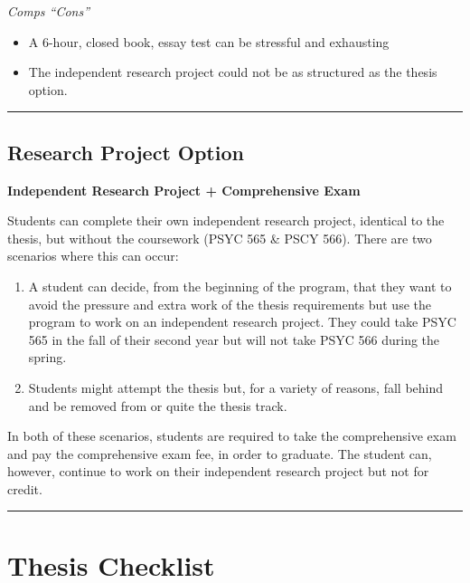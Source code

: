 \documentclass[openany]{book}
\providecommand{\tightlist}{%
  \setlength{\itemsep}{0pt}\setlength{\parskip}{0pt}}
\begin{document}
\emph{Comps ``Cons''}

\begin{itemize}
\tightlist
\item
  A 6-hour, closed book, essay test can be stressful and exhausting
\item
  The independent research project could not be as structured as the thesis option.
\end{itemize}

\begin{center}\rule{0.5\linewidth}{0.5pt}\end{center}

\hypertarget{research-project-option}{%
\section{Research Project Option}\label{research-project-option}}

\textbf{Independent Research Project + Comprehensive Exam}

Students can complete their own independent research project, identical to the thesis, but without the coursework (PSYC 565 \& PSCY 566). There are two scenarios where this can occur:

\begin{enumerate}
\def\labelenumi{\arabic{enumi}.}
\tightlist
\item
  A student can decide, from the beginning of the program, that they want to avoid the pressure and extra work of the thesis requirements but use the program to work on an independent research project. They could take PSYC 565 in the fall of their second year but will not take PSYC 566 during the spring.
\item
  Students might attempt the thesis but, for a variety of reasons, fall behind and be removed from or quite the thesis track.
\end{enumerate}

In both of these scenarios, students are required to take the comprehensive exam and pay the comprehensive exam fee, in order to graduate. The student can, however, continue to work on their independent research project but not for credit.

\begin{center}\rule{0.5\linewidth}{0.5pt}\end{center}

\hypertarget{thesis-checklist}{%
\chapter{Thesis Checklist}\label{thesis-checklist}}
\end{document}
